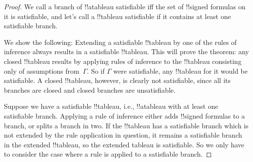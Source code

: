 \documentclass[../../../include/open-logic-section]{subfiles}
\begin{document}
\begin{proof}
We call a branch of !!a{tableau} satisfiable iff the set of
!!{signed formula}s on it is satisfiable, and let's call a !!{tableau}
satisfiable if it contains at least one satisfiable branch.

We show the following: Extending a satisfiable !!{tableau} by one of
the rules of inference always results in a satisfiable !!{tableau}.
This will prove the theorem: any closed !!{tableau} results by
applying rules of inference to the !!{tableau} consisting only of
assumptions from~$\Gamma$. So if $\Gamma$ were satisfiable, any
!!{tableau} for it would be satisfiable. A closed !!{tableau},
however, is clearly not satisfiable, since all its branches are closed
and closed branches are unsatisfiable.

Suppose we have a satisfiable !!{tableau}, i.e., !!a{tableau} with at
least one satisfiable branch. Applying a rule of inference either adds
!!{signed formula}s to a branch, or splits a branch in two. If the
!!{tableau} has a satisfiable branch which is not extended by the rule
application in question, it remains a satisfiable branch in the
extended !!{tableau}, so the extended tableau is satisfiable. So we
only have to consider the case where a rule is applied to a
satisfiable branch.


\end{proof}
\end{document}
